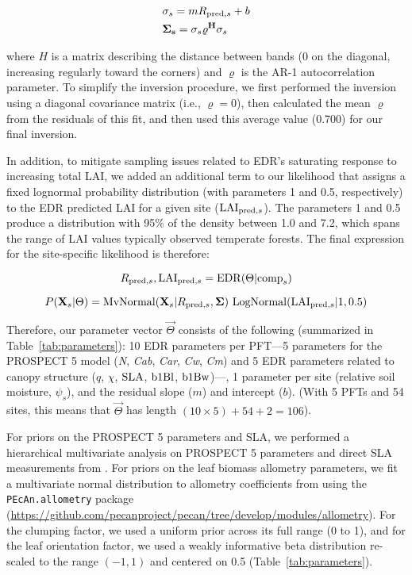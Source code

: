 \begin{align}
  & \relax{\sigma_{s}} = m R_{\mathrm{pred}, s} + b \\
  & \mathbf{\Sigma_{s}} = \relax{\sigma_{s}} \varrho^{\mathbf{H}} \relax{\sigma_{s}}
\end{align}

where $H$ is a matrix describing the distance between bands (0 on the diagonal, increasing regularly toward the corners) and $\varrho$ is the AR-1 autocorrelation parameter.
To simplify the inversion procedure, we first performed the inversion using a diagonal covariance matrix (i.e., $\varrho = 0$), then calculated the mean $\varrho$ from the residuals of this fit, and then used this average value (0.700) for our final inversion.

In addition, to mitigate sampling issues related to EDR's saturating response to increasing total LAI, we added an additional term to our likelihood that assigns a fixed lognormal probability distribution (with parameters 1 and 0.5, respectively) to the EDR predicted LAI for a given site ($\mathrm{LAI}_{\mathrm{pred}, s}$).
The parameters 1 and 0.5 produce a distribution with 95\% of the density between 1.0 and 7.2, which spans the range of LAI values typically observed temperate forests.
The final expression for the site-specific likelihood is therefore:

\begin{equation}
  R_{\mathrm{pred}, s}, \mathrm{LAI}_{\mathrm{pred}, s} = \mathrm{EDR}(\relax{\Theta} | \mathrm{comp}_{s})
\end{equation}

\begin{equation}
  P(\mathbf{X}_{s} | \relax{\Theta}) =
  \mathrm{MvNormal}(\mathbf{X}_{s} | R_{\mathrm{pred}, s}, \mathbf{\Sigma}) ~
  \mathrm{LogNormal}(\mathrm{LAI}_{\mathrm{pred}, s} | 1, 0.5)
\end{equation}

Therefore, our parameter vector $\vec{\Theta}$ consists of the following (summarized in Table~\ref{tab:parameters}):
10 EDR parameters per PFT---5 parameters for the PROSPECT 5 model (\emph{N}, \emph{Cab}, \emph{Car}, \emph{Cw}, \emph{Cm}) and 5 EDR parameters related to canopy structure ($q$, $\chi$, $\mathrm{SLA}$, $\mathrm{b1Bl}$, $\mathrm{b1Bw}$)---,
1 parameter per site (relative soil moisture, $\psi_{s}$),
and the residual slope ($m$) and intercept ($b$).
(With 5 PFTs and 54 sites, this means that $\vec{\Theta}$ has length $(10 \times 5) + 54 + 2 = 106$).

For priors on the PROSPECT 5 parameters and SLA, we performed a hierarchical multivariate analysis \citep{shiklomanov2020does} on PROSPECT 5 parameters and direct SLA measurements from \citep[][Chapter 3]{shiklomanov_dissertation}.
For priors on the leaf biomass allometry parameters, we fit a multivariate normal distribution to allometry coefficients from \citet{jenkins2003nationalscale,jenkins2004comprehensive} using the \texttt{PEcAn.allometry} package (\url{https://github.com/pecanproject/pecan/tree/develop/modules/allometry}).
For the clumping factor, we used a uniform prior across its full range (0 to 1), and for the leaf orientation factor, we used a weakly informative beta distribution re-scaled to the range $(-1, 1)$ and centered on 0.5 (Table~\ref{tab:parameters}).

